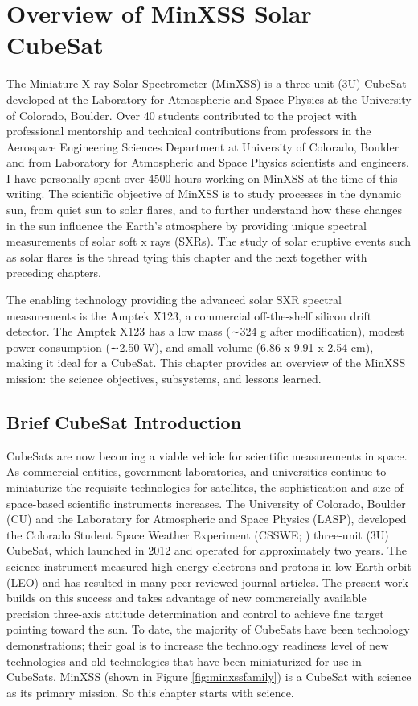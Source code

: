 \chapter{Overview of MinXSS Solar CubeSat}
\label{chapterminxssoverview}

The Miniature X-ray Solar Spectrometer (MinXSS) is a three-unit (3U) CubeSat developed at the Laboratory for Atmospheric and Space Physics at the University of Colorado, Boulder. Over 40 students contributed to the project with professional mentorship and technical contributions from professors in the Aerospace Engineering Sciences Department at University of Colorado, Boulder and from Laboratory for Atmospheric and Space Physics scientists and engineers. I have personally spent over 4500 hours working on MinXSS at the time of this writing. The scientific objective of MinXSS is to study processes in the dynamic sun, from quiet sun to solar flares, and to further understand how these changes in the sun influence the Earth’s atmosphere by providing unique spectral measurements of solar soft x rays (SXRs). The study of solar eruptive events such as solar flares is the thread tying this chapter and the next together with preceding chapters. 

The enabling technology providing the advanced solar SXR spectral measurements is the Amptek X123, a commercial off-the-shelf silicon drift detector. The Amptek X123 has a low mass (∼324 g after modification), modest power consumption (∼2.50 W), and small volume (6.86 x 9.91 x 2.54 cm), making it ideal for a CubeSat. This chapter provides an overview of the MinXSS mission: the science objectives, subsystems, and lessons learned. 


\section{Brief CubeSat Introduction}
CubeSats are now becoming a viable vehicle for scientific measurements in space. As commercial entities, government laboratories, and universities continue to miniaturize the requisite technologies for satellites, the sophistication and size of space-based scientific instruments increases. The University of Colorado, Boulder (CU) and the Laboratory for Atmospheric and Space Physics (LASP), developed the Colorado Student Space Weather Experiment (CSSWE; \citealt{Li2012, Gerhardt2013}) three-unit (3U) CubeSat, which launched in 2012 and operated for approximately two years. The science instrument measured high-energy electrons and protons in low Earth orbit (LEO) and has resulted in many peer-reviewed journal articles. The present work builds on this success and takes advantage of new commercially available precision three-axis attitude determination and control to achieve fine target pointing toward the sun. To date, the majority of CubeSats have been technology demonstrations; their goal is to increase the technology readiness level of new technologies and old technologies that have been miniaturized for use in CubeSats. MinXSS (shown in Figure \ref{fig:minxssfamily}) is a CubeSat with science as its primary mission. So this chapter starts with science. 


